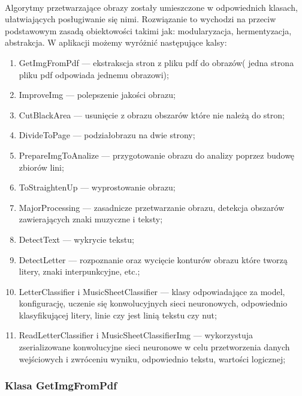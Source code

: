 \documentclass[a4paper,12pt]{article}
\begin{document}
		\paragraph{} Algorytmy  przetwarzające obrazy zosta\l y umieszczone w odpowiednich klasach, u\l atwiających pos\l ugiwanie się nimi. Rozwiązanie to wychodzi na przeciw podstawowym zasadą obiektowości takimi jak: modularyzacja, hermentyzacja, abstrakcja. W aplikacji możemy wyróżnić następujące kalsy:
		\begin{spacing}{1}
    		\begin{enumerate}
    			\item GetImgFromPdf --- ekstrakscja stron z pliku pdf do obrazów( jedna strona pliku pdf odpowiada jednemu obrazowi);
    			\item ImproveImg --- polepszenie jakości obrazu;
    			\item CutBlackArea --- usunięcie z obrazu obszarów które nie należą do stron;
    			\item DivideToPage --- podzia\l obrazu na dwie strony;
    			\item PrepareImgToAnalize --- przygotowanie obrazu do analizy poprzez budowę zbiorów lini;
    			\item ToStraightenUp --- wyprostowanie obrazu;
    			\item MajorProcessing --- zasadnicze przetwarzanie obrazu, detekcja obszarów zawierających znaki muzyczne i teksty; 
    			\item DetectText --- wykrycie tekstu;
    			\item DetectLetter --- rozpoznanie oraz wycięcie konturów obrazu które tworzą litery, znaki interpunkcyjne, etc.;
    			\item LetterClassifier i MusicSheetClassifier --- klasy odpowiadające za model, konfigurację, uczenie się konwolucyjnych sieci neuronowych, odpowiednio klasyfikującej litery, linie czy jest linią tekstu czy nut;
    			\item ReadLetterClassifier i MusicSheetClassifierImg --- wykorzystuja zserializowane konwolucyjne sieci neuronowe w celu przetworzenia danych wejściowych i zwróceniu wyniku, odpowiednio tekstu, wartości logicznej;
    		\end{enumerate} 
        \end{spacing}
        
	\subsubsection{Klasa GetImgFromPdf}
\end{document}
